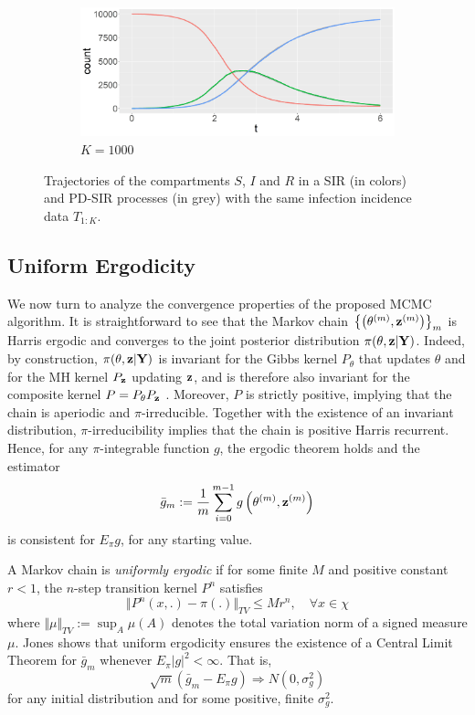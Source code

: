 \documentclass[11pt]{article}
\begin{document}
\begin{figure}
\begin{subfigure}[b]{0.49\textwidth}
			\centering
			\includegraphics[width=\textwidth]{E2_K1000}
			\caption{$K = 1000$}
			\label{fig:comparison_RD_SIR_K1000}
		\end{subfigure}
		\caption{Trajectories of the compartments $S$, $I$ and $R$ in a SIR (in colors) and PD-SIR processes (in grey) with the same infection incidence data $T_{1:K}$.}
		\label{fig:comparison}
	\end{figure}
	\smallskip
	
	\subsection{Uniform Ergodicity}
	\label{sec:uni}
	We now turn to analyze the convergence properties of the proposed MCMC algorithm. 
	It is straightforward to see that the Markov chain $\left\{\left(\theta^{(m)}, \mathbf{z}^{(m)}\right)\right\}_m$ is Harris ergodic and converges to the joint posterior distribution $\pi(\theta, \mathbf{z}|\mathbf{Y})$. Indeed, 
	by construction, $\pi(\theta, \mathbf{z}|\mathbf{Y})$ is invariant for the Gibbs kernel $P_\theta$ that updates $\theta$ and for the MH kernel $P_{\mathbf{z}}$ updating $\mathbf{z}$, and is therefore also invariant for the composite kernel $P=P_\theta P_{\mathbf{z}}$ \cite{Tierney.1994}. Moreover, $P$ is strictly positive, implying that the chain is aperiodic and $\pi$-irreducible. Together with the existence of an invariant distribution, $\pi$-irreducibility implies that the chain is positive Harris recurrent. Hence, for any $\pi$-integrable function $g$, the ergodic theorem holds and the estimator
	$$\bar{g}_m := \frac{1}{m} \sum_{i=0}^{m-1} g\left(\theta^{(m)}, \mathbf{z}^{(m)}\right)$$
	is consistent for $E_\pi g$, for any starting value. 
	
	A Markov chain is \textit{uniformly ergodic} if for some finite $M$ and positive constant $r<1$, the $n$-step transition kernel $P^n$ satisfies
	$$
	\Vert P^n(x,.)-\pi(.)\Vert_{TV} \le M r^n, \quad \forall x \in \chi
	$$
	where $\Vert \mu \Vert_{TV} := \sup_A \mu(A)$ denotes the total variation norm of a signed measure $\mu$.
	Jones \cite{Jones.2004b} shows that uniform ergodicity ensures the existence of a Central Limit Theorem for $\bar{g}_m$ whenever $E_\pi |g|^2 < \infty$. That is,
	$$\sqrt{m}(\bar{g}_m - E_\pi g) \Rightarrow N(0, \sigma^2_g)$$
	for any initial distribution and for some positive, finite $\sigma^2_g$. %
	
\end{document}
